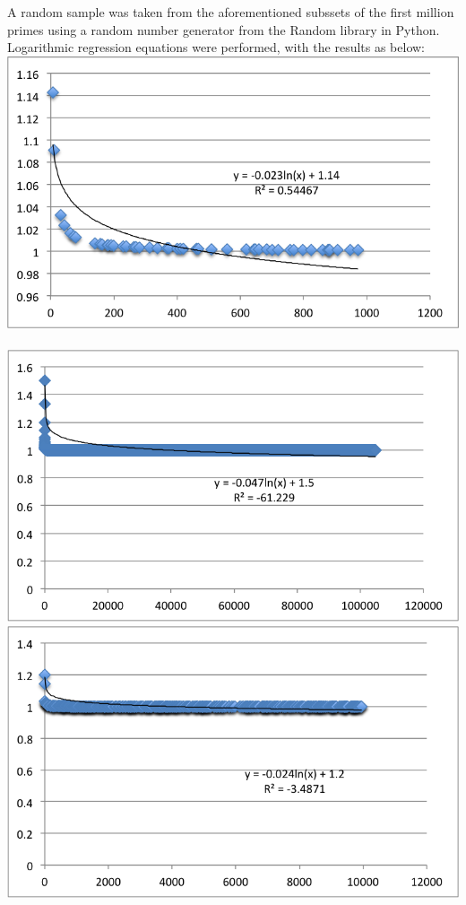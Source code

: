 \documentclass[11pt]{article}
\begin{document}
A random sample was taken from the aforementioned subssets of the first million primes using a random number generator from the Random library in Python. Logarithmic regression equations were performed, with the results as below:\\
\includegraphics[scale=0.5]{Untitled1.png}
\\ \\
\includegraphics[scale=0.5]{Untitled2.png}
\\
\includegraphics[scale=0.5]{Untitled3.png}
\end{document}
